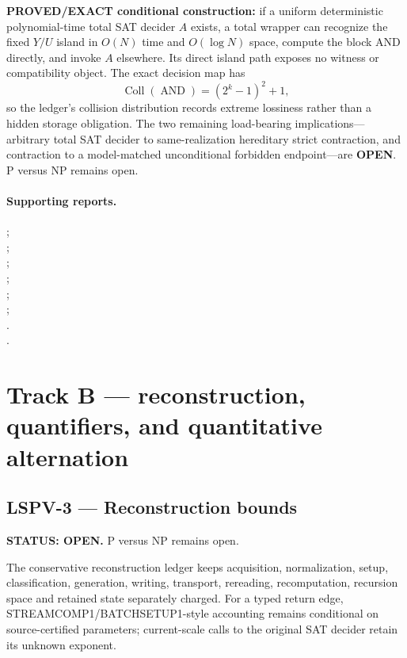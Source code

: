 \documentclass[11pt]{article}
\begin{document}
\textbf{PROVED/EXACT conditional construction:} if a uniform deterministic polynomial-time total SAT decider \(A\) exists, a total wrapper can recognize the fixed \(Y/U\) island in \(O(N)\) time and \(O(\log N)\) space, compute the block AND directly, and invoke \(A\) elsewhere.  Its direct island path exposes no witness or compatibility object.  The exact decision map has
\[
 \operatorname{Coll}(\operatorname{AND})= (2^k-1)^2+1,
\]
so the ledger's collision distribution records extreme lossiness rather than a hidden storage obligation.  The two remaining load-bearing implications---arbitrary total SAT decider to same-realization hereditary strict contraction, and contraction to a model-matched unconditional forbidden endpoint---are \textbf{OPEN}.  P versus NP remains open.

\paragraph{Supporting reports.}
;\\
;\\
;\\
;\\
;\\
;\\
.\\
.

\section{Track B --- reconstruction, quantifiers, and quantitative alternation}

\subsection{LSPV-3 --- Reconstruction bounds}
\textbf{STATUS: OPEN.} P versus NP remains open.

The conservative reconstruction ledger keeps acquisition, normalization, setup, classification, generation, writing, transport, rereading, recomputation, recursion space and retained state separately charged. For a typed return edge, STREAMCOMP1/BATCHSETUP1-style accounting remains conditional on source-certified parameters; current-scale calls to the original SAT decider retain its unknown exponent.
\end{document}
